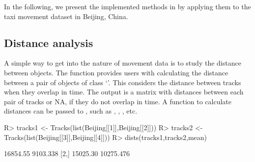 \documentclass[article]{jss}
\newcommand{\class}[1]{`\code{#1}'}
\begin{document}
  In the following, we present the implemented methods in  by applying them to the taxi movement dataset in Beijing, China. 
\subsection{Distance analysis}\label{distanal}
  A simple way to get into the nature of movement data is to study the distance between objects. The function  provides users with calculating the distance between a pair of objects of class \class{Tracks}. This considers the distance between tracks when they overlap in time. The output is a matrix with distances between each pair of tracks or NA, if they do not overlap in time. A function to calculate distances can be passed to , such as , , , etc.

\begin{Schunk}
\begin{Sinput}
R>  tracks1 <- Tracks(list(Beijing[[1]],Beijing[[2]]))
R>  tracks2 <- Tracks(list(Beijing[[3]],Beijing[[4]]))
R>  dists(tracks1,tracks2,mean)
\end{Sinput}
\begin{Soutput}
         [,1]      [,2]
[1,] 16854.55  9103.338
[2,] 15025.30 10275.476
\end{Soutput}
\end{Schunk}
\end{document}
